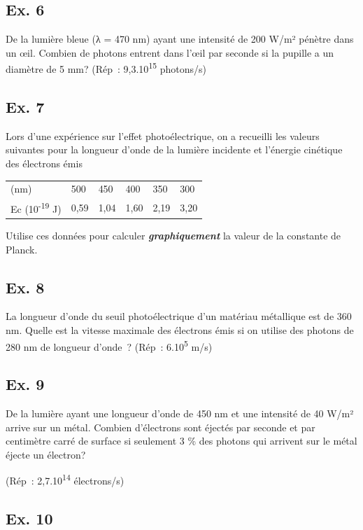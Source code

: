 {{{\subsection{Ex. 6}

De la lumière bleue (λ = 470 nm) ayant une intensité de 200 W/m² pénètre
dans un œil. Combien de photons entrent dans l'œil par seconde si la
pupille a un diamètre de 5 mm? (Rép~: 9,3.10\textsuperscript{15
}photons/s)

\subsection{Ex. 7}

Lors d'une expérience sur l'effet photoélectrique, on a recueilli les
valeurs suivantes pour la longueur d'onde de la lumière incidente et
l'énergie cinétique des électrons émis

\begin{longtable}[]{@{}llllll@{}}
(nm) & 500 & 450 & 400 & 350 & 300\tabularnewline
Ec (10\textsuperscript{-19} J) & 0,59 & 1,04 & 1,60 & 2,19 &
3,20\tabularnewline
\end{longtable}

Utilise ces données pour calculer \emph{\textbf{graphiquement}} la
valeur de la constante de Planck.

\subsection{Ex. 8}

La longueur d'onde du seuil photoélectrique d'un matériau métallique est
de 360 nm. Quelle est la vitesse maximale des électrons émis si on
utilise des photons de 280 nm de longueur d'onde~? (Rép~:
6.10\textsuperscript{5} m/s)

\subsection{Ex. 9}

De la lumière ayant une longueur d'onde de 450 nm et une intensité de 40
W/m² arrive sur un métal. Combien d'électrons sont éjectés par seconde
et par centimètre carré de surface si seulement 3 \% des photons qui
arrivent sur le métal éjecte un électron?

(Rép~: 2,7.10\textsuperscript{14} électrons/s)

\subsection{Ex. 10}

}}}
